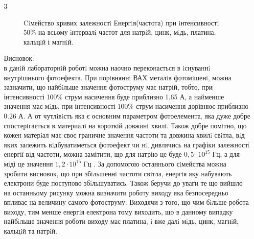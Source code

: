 \documentclass[a4paper,14pt]{extreport}
\begin{document}
\begin{center}3\end{center}
\begin{figure}[h]
\caption{Ciмейство кривих залежностi Енергiя(частота) при iнтенсивностi 50\% на всьому iнтервалi частот для натрiй, цинк, мiдь, платина, кальцiй і магнiй.}
\label{ris8}
\end{figure}
\newpage
Висновок:\\
в данiй лабораторнiй роботi можна наочно переконається в iснуваннi внутрiшнього фотоефекта. При порiвняннi ВАХ металiв фотомiшенi, можна зазначити, що найбiльше значення фотоструму має натрій, тобто, при інтенсивності 100\% струм насичення буде приблизно 1.65 А, а найменше значення має мiдь, при інтенсивності 100\% струм насичення дорівнює приблизно 0.26 А. А от чутлiвiсть яка є основним параметром фотоелемента, яка дуже добре спостерiгається в материалi на короткiй довжинi хвилi. Також добре помiтно, що кожен матерiал має своє граничне значення частоти та довжина хвилi свiтла, вiд яких залежить вiдбуватиметься фотоефект чи нi, дивлячись на графіки залежності енергії від частоти, можна замітити, що для натрію це буде $0,5\cdot10^{15}$ Гц, а для міді це значення $1,2\cdot10^{15}$ Гц . За допомогою останнього сiмейства можна зробити висновок, що при збiльшеннi частоти свiтла, енергiя яку набувають електрони буде поступово збiльшуватись. Також беручи до уваги те що вийшло на останньому рисунку можна визначити роботу виходу яка безпосередньо впливає на величину самого фотоструму. Виходячи з того, що чим бiльше робота виходу, тим менше енергiя електрона тому виходить, що в данному випадку найбiльше значення роботи виходу має платина, i вже далi мiдь, цинк, магнiй, кальцiй та натрiй.
\end{document}
